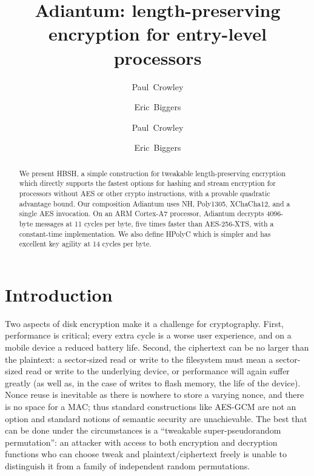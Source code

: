 \documentclass[journal=tosc,preprint,floatrow,submission]{iacrtrans}
\title{{Adiantum}: length-preserving encryption for entry-level processors}
\author{Paul~Crowley \and Eric~Biggers}
\institute{Google LLC \\ \email[paulcrowley@google.com,ebiggers@google.com]{{paulcrowley,ebiggers}@google.com}}
\author{Paul~Crowley}
\author{Eric~Biggers}
\affil{Google LLC}
\begin{document}
\maketitle
\iftoggle{iacr}{
    \keywords{strong pseudorandom permutation \and
        variable input length \and
        tweakable encryption \and
        disk encryption}
}{ %
} %

\begin{abstract}
    We present HBSH, a simple construction for tweakable length-preserving encryption which
    directly supports the fastest options for hashing and stream encryption for processors
    without AES or other crypto instructions, with a provable
    quadratic advantage bound. Our composition Adiantum uses NH, Poly1305, XChaCha12,
    and a single AES invocation. On an ARM Cortex-A7 processor, Adiantum decrypts
    4096-byte messages at 11 cycles per byte, five times faster than
    AES-256-XTS, with a constant-time implementation. We also define HPolyC which is
    simpler and has excellent key agility at 14 cycles per byte.
\iftoggle{iacr}{
}{

    This paper: \url{https://ia.cr/2018/720} \\
    Source: \url{https://github.com/google/adiantum} \\
    Email: \href{mailto:paulcrowley@google.com,ebiggers@google.com}{\{paulcrowley,ebiggers\}@google.com}
}
\end{abstract}

\section{Introduction}
Two aspects of disk encryption make it a challenge for cryptography.  First,
performance is critical; every extra cycle is a worse user experience, and on a mobile device
a reduced battery life.  Second, the ciphertext can be no larger than the plaintext: a sector-sized
read or write to the filesystem must mean a sector-sized read or write to the underlying device,
or performance will again suffer greatly
(as well as, in the case of writes to flash memory, the life of the device).
Nonce reuse is inevitable as there is nowhere to store a varying nonce, and there is no space
for a MAC; thus standard constructions like AES-GCM are not an option and standard notions
of semantic security are unachievable.  The best that can be done under the circumstances is
a ``tweakable super-pseudorandom permutation'': an attacker with access to both encryption
and decryption functions who can choose tweak and plaintext/ciphertext freely is unable to
distinguish it from a family of independent random permutations.
\end{document}
